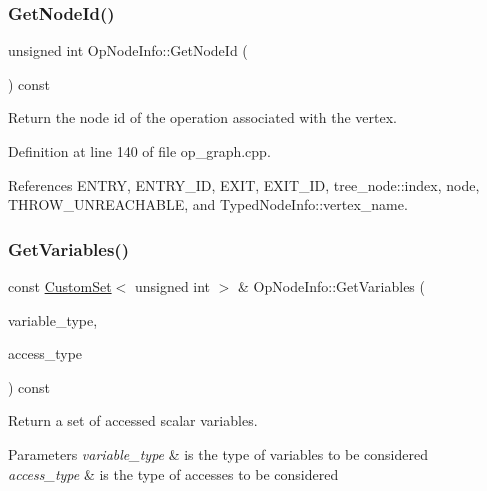 \subsubsection{\texorpdfstring{Get\+Node\+Id()}{GetNodeId()}}
{\footnotesize\ttfamily unsigned int Op\+Node\+Info\+::\+Get\+Node\+Id (\begin{DoxyParamCaption}{ }\end{DoxyParamCaption}) const}



Return the node id of the operation associated with the vertex. 



Definition at line 140 of file op\+\_\+graph.\+cpp.



References E\+N\+T\+RY, E\+N\+T\+R\+Y\+\_\+\+ID, E\+X\+IT, E\+X\+I\+T\+\_\+\+ID, tree\+\_\+node\+::index, node, T\+H\+R\+O\+W\+\_\+\+U\+N\+R\+E\+A\+C\+H\+A\+B\+LE, and Typed\+Node\+Info\+::vertex\+\_\+name.

\mbox{\label{structOpNodeInfo_aea18a24d98562fb66b276ac3240e294e}} 
\subsubsection{\texorpdfstring{Get\+Variables()}{GetVariables()}}
{\footnotesize\ttfamily const \hyperlink{custom__set_8hpp_a615bc2f42fc38a4bb1790d12c759e86f}{Custom\+Set}$<$ unsigned int $>$ \& Op\+Node\+Info\+::\+Get\+Variables (\begin{DoxyParamCaption}\item[{const \hyperlink{function__behavior_8hpp_aff0ab7827d49a7aca1f277e0ff126755}{Function\+Behavior\+\_\+\+Variable\+Type}}]{variable\+\_\+type,  }\item[{const \hyperlink{function__behavior_8hpp_a68c28bfcfefbe63cece191e941af0409}{Function\+Behavior\+\_\+\+Variable\+Access\+Type}}]{access\+\_\+type }\end{DoxyParamCaption}) const}



Return a set of accessed scalar variables. 


\begin{DoxyParams}{Parameters}
{\em variable\+\_\+type} & is the type of variables to be considered \\
\hline
{\em access\+\_\+type} & is the type of accesses to be considered \\
\hline
\end{DoxyParams}


